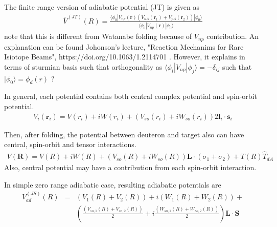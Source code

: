 \documentclass[11pt]{book}
\def\bm{\boldsymbol}
\def\vr{{\bm r}}
\def\vR{{\bm R}}
\def\la{\langle}
\def\ra{\rangle}
\newcommand{\bea}{\begin{eqnarray}}
\newcommand{\eea}{\end{eqnarray}}
\newcommand{\no}{\nonumber \\}
\begin{document}
The finite range version of adiabatic potential (JT) is given as
\bea 
\bar{V}^{(JT)}(R)=\frac{\la \phi_0|V_{np}(\vr)(V_{nA}(\vr_1)+V_{pA}(\vr_2))|\phi_0\ra}{\la \phi_0|V_{np}(\vr)|\phi_0\ra }
\eea  
note that this is different from Watanabe folding because of $V_{np}$ contribution. 
{\color{red} An explanation can be found Johonson's lecture,
	"Reaction Mechanims for Rare Isiotope Beams", https://doi.org/10.1063/1.2114701 
	. However, it explains in terms of sturmian basis such that 
    orthogonality as $\la \phi_i|V_{np}|\phi_j\ra=-\delta_{ij}$ such that 
    $|\phi_0\ra =\phi_d(r)$ ? } 

In general, each potential contains both central complex potential and
spin-orbit potential.   
\bea 
V_{i}(\vr_i)=V(r_i)+iW(r_i)+(V_{so}(r_i)+i W_{so}(r_i))2 {\bm l_i}\cdot{\bm s}_i
\eea 

Then, after folding, the potential between deuteron and target also can have
central, spin-orbit and tensor interactions.
\bea 
V(\vR)=V(R)+i W(R)+ (V_{so}(R)+i W_{so}(R)){\bm L}\cdot(\sigma_1+\sigma_2)+T(R)\hat{T}_{dA} 
\eea 
Also, central potential may have a contribution from each spin-orbit interaction. 

In simple zero range adiabatic case, resulting adiabatic potentials are
\bea 
V_{ad}^{(JS)}(R)& =& (V_1(R)+V_2(R))+i(W_1(R)+W_2(R))+ \no & &
   \left(\frac{(V_{so,1}(R)+V_{so,2}(R))}{2}+i \frac{(W_{so,1}(R)+W_{so,2}(R))}{2}\right)
   {\bm L}\cdot{\bm S} 
\eea  
\end{document}
